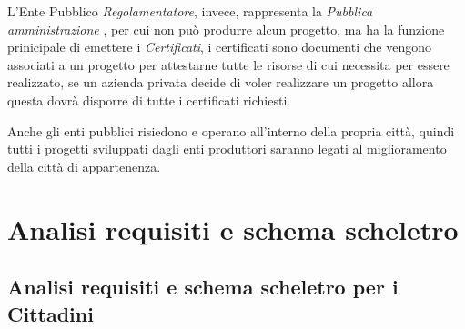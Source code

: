 \documentclass{article}
\begin{document}
\par\vspace{0.3cm}

L'Ente Pubblico \textit{Regolamentatore}, invece, rappresenta la \textit{Pubblica amministrazione} , per cui non può produrre alcun progetto, ma ha la funzione prinicipale di emettere i \textit{Certificati}, i certificati sono documenti che vengono associati a un progetto per attestarne tutte le risorse di cui necessita per essere realizzato, se un azienda privata decide di voler realizzare un progetto allora questa dovrà disporre di tutte i certificati richiesti.

\par\vspace{0.3cm}

Anche gli enti pubblici risiedono e operano all'interno della propria città, quindi tutti i progetti sviluppati dagli enti produttori saranno legati al miglioramento della città di appartenenza.

\par\vspace{0.3cm}


\newpage
\section{Analisi requisiti e schema scheletro}


\subsection{Analisi requisiti e schema scheletro per i Cittadini}
\end{document}
